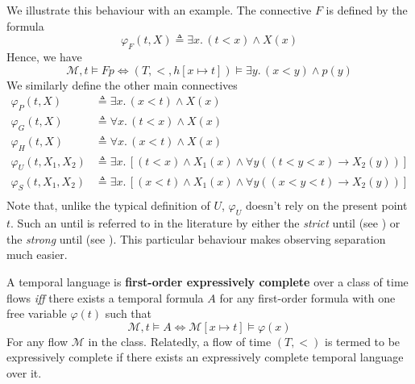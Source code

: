\documentclass[a4paper,UKenglish,cleveref, autoref, thm-restate]{lipics-v2021}
\begin{document}
We illustrate this behaviour with an example. The connective $F$ is defined by the formula
\begin{equation*}
    \varphi_F(t, X) \triangleq \exists x.\, (t < x) \land X(x)
\end{equation*}
Hence, we have
\begin{equation*}
    \mathcal{M}, t \vDash F p \Longleftrightarrow (T, <, h[x \mapsto t]) \vDash \exists y.\, (x < y) \land p(y)
\end{equation*}
We similarly define the other main connectives
\begin{equation*}
    \begin{aligned}
        \varphi_P(t, X) &\triangleq \exists x.\, (x < t) \land X(x)\\
        \varphi_G(t, X) &\triangleq \forall x.\, (t < x) \land X(x)\\
        \varphi_H(t, X) &\triangleq \forall x.\, (x < t) \land X(x)\\
        \varphi_U(t, X_1, X_2) &\triangleq \exists x.\, \left[ \left( t < x \right) \land X_1(x) \land \forall y \left( \left( t < y < x \right) \to X_2(y) \right) \right]\\
        \varphi_S(t, X_1, X_2) &\triangleq \exists x.\, \left[ \left( x < t \right) \land X_1(x) \land \forall y \left( \left( x < y < t \right) \to X_2(y) \right) \right]\\
    \end{aligned}
\end{equation*}
Note that, unlike the typical definition of $U$, $\varphi_U$ doesn’t rely on the present point $t$. Such an until is referred to in the literature by either the \textit{strict} until (see \cite{gastinStrictUntil06}) or the \textit{strong} until (see \cite{BeCl16}). This particular behaviour makes observing separation much easier.

\begin{definition}
    \label{expressive-completeness-definition}
    A temporal language is \textbf{first-order expressively complete} over a class of time flows \textit{iff} there exists a temporal formula $A$ for any first-order formula with one free variable $\varphi(t)$ such that
\begin{equation*}
    \mathcal{M}, t \vDash A \Longleftrightarrow \mathcal{M}[x \mapsto t] \vDash \varphi(x)
\end{equation*}
    For any flow $\mathcal{M}$ in the class. Relatedly, a flow of time $(T, <)$ is termed to be expressively complete if there exists an expressively complete temporal language over it.
\end{definition}
\end{document}
